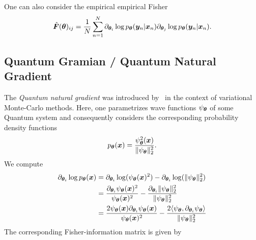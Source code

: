 One can also consider the empirical empirical Fisher 
\begin{align}
    \hat{{\bm{F}}}({\bm{\theta}})_{ij} = \frac1N\sum_{n=1}^N  \partial_{{\bm{\theta}}_i} \log p_{{\bm{\theta}}}({\bm{y}}_n|{\bm{x}}_n) \partial_{{\bm{\theta}}_j} \log p_{{\bm{\theta}}}({\bm{y}}_n|{\bm{x}}_n). 
\end{align}

\subsection{Quantum Gramian / Quantum Natural Gradient}

The \emph{Quantum natural gradient} was introduced by~\cite{stokes2020quantum} in the context of variational Monte-Carlo methods. Here, one parametrizes wave functions $\psi_{\bm{\theta}}$ of some Quantum system  %
and consequently considers the corresponding probability density functions  
\begin{align}
    p_{\bm{\theta}}({\bm{x}}) = \frac{\psi_{\bm{\theta}}^2({\bm{x}})}{\lVert \psi_{\bm{\theta}} \rVert_2^2}. 
\end{align}
We compute 
\begin{align}
    \partial_{{\bm{\theta}}_i} \log p_{{\bm{\theta}}}({\bm{x}}) & = \partial_{{\bm{\theta}}_i} \log(\psi_{{\bm{\theta}}}({\bm{x}})^2) - \partial_{{\bm{\theta}}_i} \log(\lVert \psi_{{\bm{\theta}}}\rVert_2^2) 
    \\ & = \frac{\partial_{{\bm{\theta}}_i} \psi_{\bm{\theta}}({\bm{x}})^2}{\psi_{\bm{\theta}}({\bm{x}})^2} - \frac{\partial_{{\bm{\theta}}_i} \lVert\psi_{\bm{\theta}} \rVert_2^2}{\lVert\psi_{\bm{\theta}} \rVert_2^2} 
    \\ & = \frac{2\psi_{\bm{\theta}}({\bm{x}})\partial_{{\bm{\theta}}_i} \psi_{\bm{\theta}}({\bm{x}})}{\psi_{\bm{\theta}}({\bm{x}})^2} - \frac{2 \langle \psi_{\bm{\theta}}, \partial_{{\bm{\theta}}_i} \psi_{\bm{\theta}} \rangle }{\lVert\psi_{\bm{\theta}} \rVert_2^2} 
\end{align}
The corresponding Fisher-information matrix is given by 
